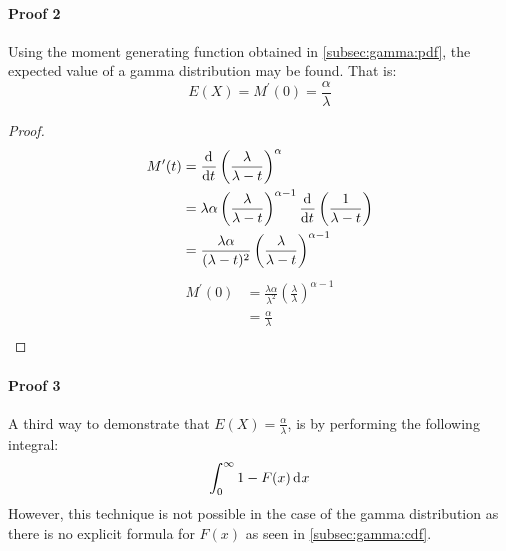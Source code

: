 \documentclass[12pt]{article}
\begin{document}
\paragraph{Proof 2}
Using the moment generating function obtained in \autoref{subsec:gamma:pdf}, the expected value of a gamma distribution
may be found. That is:
\begin{equation}
	E(X) = M^\prime(0) = \frac{\alpha}{\lambda}
\end{equation}
\begin{proof}
	\begin{equation}\label{eq:gamma:mgfprime}
		\begin{split}
			M^\prime(t)	&=	\mathop{}\!\frac{\mathrm{d}^{}}{\mathrm{d}t^{}}\left(\frac{\lambda}{\lambda - t}\right)^\alpha\\
						&=	\lambda\alpha\left(\frac{\lambda}{\lambda - t}\right)^{\alpha-1}\mathop{}\!\frac{\mathrm{d}^{}}{\mathrm{d}t^{}}\left(\frac{1}{\lambda - t}\right)\\
						&=	\frac{\lambda\alpha}{(\lambda - t)^2}\left(\frac{\lambda}{\lambda - t}\right)^{\alpha-1}
		\end{split}
	\end{equation}
	\begin{equation}
		\begin{split}
			M^\prime(0)	&=	\frac{\lambda\alpha}{\lambda^2}\left(\frac{\lambda}{\lambda}\right)^{\alpha-1}\\
						&=	\frac{\alpha}{\lambda}\\
		\end{split}
	\end{equation}
\end{proof}

\paragraph{Proof 3}
A third way to demonstrate that $E(X) = \frac{\alpha}{\lambda}$, is by performing the following integral:
\begin{equation}
	\int^\infty_0 1-F(x)\mathop{}\!\mathrm{d^{}}x
\end{equation}
However, this technique is not possible in the case of the gamma distribution as there is no explicit formula for $F(x)$
as seen in \autoref{subsec:gamma:cdf}.
\end{document}
